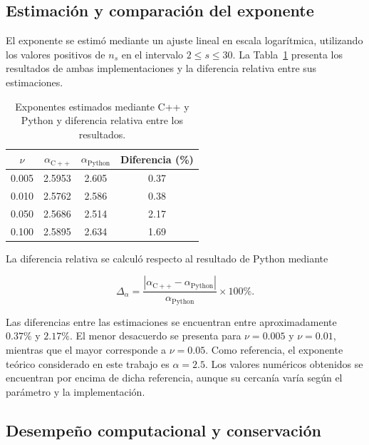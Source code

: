 \documentclass[
a4paper,
amsfonts,
amssymb,
amsmath,
reprint,
twoside
]{revtex4-1}
\begin{document}
\subsection{Estimación y comparación del exponente}

El exponente se estimó mediante un ajuste lineal en escala
logarítmica, utilizando los valores positivos de $n_s$ en el
intervalo $2\leq s\leq 30$. La Tabla~\ref{tab:exponentes}
presenta los resultados de ambas implementaciones y la diferencia
relativa entre sus estimaciones.

\begin{table}[htbp]
    \centering
    \caption{Exponentes estimados mediante C++ y Python y
    diferencia relativa entre los resultados.}
    \label{tab:exponentes}
    \begin{tabular}{cccc}
        \toprule
        $\nu$ & $\alpha_{\mathrm{C++}}$ &
        $\alpha_{\mathrm{Python}}$ & Diferencia (\%) \\
        \midrule
        0.005 & 2.5953 & 2.605 & 0.37 \\
        0.010 & 2.5762 & 2.586 & 0.38 \\
        0.050 & 2.5686 & 2.514 & 2.17 \\
        0.100 & 2.5895 & 2.634 & 1.69 \\
        \bottomrule
    \end{tabular}
\end{table}

La diferencia relativa se calculó respecto al resultado de
Python mediante

\begin{equation}
    \Delta_{\alpha}=
    \frac{\left|\alpha_{\mathrm{C++}}-
    \alpha_{\mathrm{Python}}\right|}
    {\alpha_{\mathrm{Python}}}\times 100\%.
\end{equation}

Las diferencias entre las estimaciones se encuentran entre
aproximadamente $0.37\%$ y $2.17\%$. El menor desacuerdo se
presenta para $\nu=0.005$ y $\nu=0.01$, mientras que el mayor
corresponde a $\nu=0.05$. Como referencia, el exponente teórico
considerado en este trabajo es $\alpha=2.5$. Los valores
numéricos obtenidos se encuentran por encima de dicha referencia,
aunque su cercanía varía según el parámetro y la implementación.

\subsection{Desempeño computacional y conservación}
\end{document}

